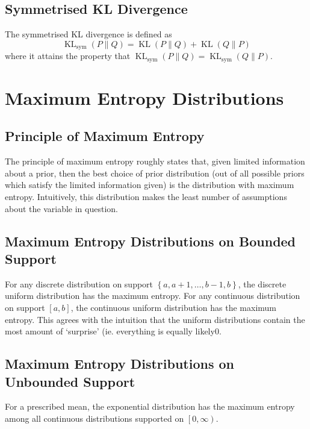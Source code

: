 \documentclass[11pt]{report} %
\begin{document}
\subsection{Symmetrised KL Divergence}

The symmetrised KL divergence is defined as
\begin{equation}
\operatorname{KL}_{\mathrm{sym}}\left(P\middle\|Q\right) = \operatorname{KL}\left(P\middle\|Q\right) + \operatorname{KL}\left(Q\middle\|P\right)
\end{equation}
where it attains the property that $\operatorname{KL}_{\mathrm{sym}}\left(P\middle\|Q\right) = \operatorname{KL}_{\mathrm{sym}}\left(Q\middle\|P\right)$.

\section{Maximum Entropy Distributions}

\subsection{Principle of Maximum Entropy}

The principle of maximum entropy roughly states that, given limited information about a prior, then the best choice of prior distribution (out of all possible priors which satisfy the limited information given) is the distribution with maximum entropy. Intuitively, this distribution makes the least number of assumptions about the variable in question.

\subsection{Maximum Entropy Distributions on Bounded Support}
For any discrete distribution on support $\left\{a, a + 1, \dots, b - 1, b\right\}$, the discrete uniform distribution has the maximum entropy. For any continuous distribution on support $\left[a, b\right]$, the continuous uniform distribution has the maximum entropy. This agrees with the intuition that the uniform distributions contain the most amount of `surprise' (ie. everything is equally likely0.

\subsection{Maximum Entropy Distributions on Unbounded Support}

For a prescribed mean, the exponential distribution has the maximum entropy among all continuous distributions supported on $\left[0, \infty\right)$. \\
\end{document}
